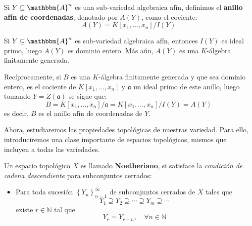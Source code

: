 \documentclass[12pt]{report}
\theoremstyle{largebreak}
\newcommand{\bbm}[1]{\ensuremath{\mathbbm{#1}}}
\newcommand{\fk}[1]{\ensuremath{\mathfrak{#1}}}
\begin{document}
    \begin{mydef}
        Si $Y\subseteq\bbm{A}^n$ es una sub-variedad algebraica afín, definimos el \textbf{anillo afín de coordenadas}, denotado por $A(Y)$, como el cociente:
        \begin{equation*}
            A(Y)=K[x_1,...,x_n]/I(Y)
        \end{equation*}
    \end{mydef}

    \begin{obs}
        Si $Y\subseteq\bbm{A}^n$ es sub-variedad algebraica afín, entonces $I(Y)$ es ideal primo, luego $A(Y)$ es dominio entero. Más aún, $A(Y)$ es una $K$-álgebra finitamente generada.

        Recíprocamente, si $B$ es una $K$-álgebra finitamente generada y que sea dominio entero, es el cociente de $K[x_1,...,x_n]$ y $\fk{a}$ un ideal primo de este anillo, luego tomando $Y=Z(\fk{a})$ se sigue que:
        \begin{equation*}
            B=K[x_1,...,x_n]/\fk{a}=K[x_1,...,x_n]/I(Y)=A(Y)
        \end{equation*}
        es decir, $B$ es el anillo afín de coordenadas de $Y$.
    \end{obs}

    Ahora, estudiaremos las propiedades topológicas de nuestras variedad. Para ello, introduciremos una clase importante de espacios topológicos, mismos que incluyen a todas las variedades.

    \begin{mydef}
        Un espacio topológico $X$ es llamado \textbf{Noetheriano}, si satisface la \textit{condición de cadena descendiente} para subconjuntos cerrados:
        \begin{itemize}
            \item Para toda sucesión $\left\{Y_n \right\}_{ n=1}^\infty$ de subconjuntos cerrados de $X$ tales que
            \begin{equation*}
                Y_1\supseteq Y_2\supseteq\cdots\supseteq Y_m\supseteq\cdots
            \end{equation*}
            existe $r\in\mathbb{N}$ tal que
            \begin{equation*}
                Y_r=Y_{ r+n},\quad\forall n\in\mathbb{N}
            \end{equation*}
        \end{itemize}
    \end{mydef}
\end{document}
